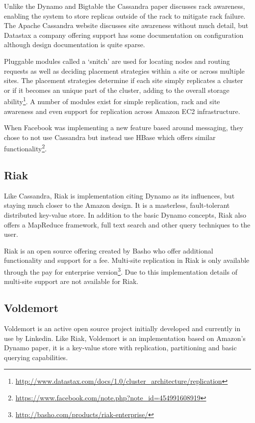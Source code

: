 Unlike the Dynamo and Bigtable the Cassandra paper discusses rack awareness, enabling the system to store replicas outside of the rack to mitigate rack failure. The Apache Cassandra website discusses site awareness without much detail, but Datastax a company offering support has some documentation on configuration although design documentation is quite sparse.

Pluggable modules called a `snitch' are used for locating nodes and routing requests as well as deciding placement strategies within a site or across multiple sites. The placement strategies determine if each site simply replicates a cluster or if it becomes an unique part of the cluster, adding to the overall storage ability\footnote{\url{http://www.datastax.com/docs/1.0/cluster_architecture/replication}}. A number of modules exist for simple replication, rack and site awareness and even support for replication across Amazon EC2 infrastructure.

When Facebook was implementing a new feature based around messaging, they chose to not use Cassandra but instead use HBase which offers similar functionality\footnote{\url{https://www.facebook.com/note.php?note_id=454991608919}}.

\subsection{Riak}
Like Cassandra, Riak\cite{riak} is implementation citing Dynamo as its influences, but staying much closer to the Amazon design. It is a masterless, fault-tolerant distributed key-value store. In addition to the basic Dynamo concepts, Riak also offers a MapReduce framework, full text search and other query techniques to the user. 

Riak is an open source offering created by Basho who offer additional functionality and support for a fee. Multi-site replication in Riak is only available through the pay for enterprise version\footnote{\url{http://basho.com/products/riak-enterprise/}}. Due to this implementation details of multi-site support are not available for Riak.

\subsection{Voldemort}
Voldemort\cite{voldemort} is an active open source project initially developed and currently in use by Linkedin. Like Riak, Voldemort is an implementation based on Amazon’s Dynamo paper, it is a key-value store with replication, partitioning and basic querying capabilities.

